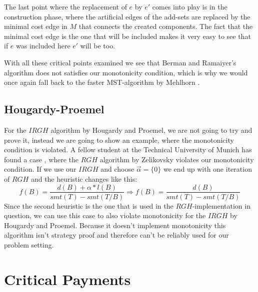 The last point where the replacement of $e$ by $e'$ comes into play is in the construction phase, where the artificial edges of the add-sets are replaced by the minimal cost edge in $M$ that connects the created components. The fact that the minimal cost edge is the one that will be included makes it very easy to see that if $e$ was included here $e'$ will be too.

With all these critical points examined we see that Berman and Ramaiyer's algorithm does not satisfies our monotonicity condition, which is why we would once again fall back to the faster MST-algorithm by Mehlhorn \cite{mehlhorn1988faster}.
\subsection{Hougardy-Proemel}

For the $IRGH$ algorithm by Hougardy and Proemel, we are not going to try and prove it, instead we are going to show an example, where the monotonicity condition is violated. A fellow student at the Technical University of Munich has found a case \cite{guggenbichler20}, where the $RGH$ algorithm by Zelikovsky \cite{zelikovsky1996better} violates our monotonicity condition. If we use our $IRGH$ and choose $\vec{\alpha}=\{ 0\}$ we end up with one iteration of $RGH$ and the heuristic changes like this: 
$$f(B) = \frac{d(B) + \alpha * l(B)}{smt(T)-smt(T/B)} \Rightarrow f(B) = \frac{d(B)}{smt(T)-smt(T/B)}$$
Since the second heuristic is the one that is used in the $RGH$-implementation in question, we can use this case to also violate monotonicity for the $IRGH$ by Hougardy and Proemel. Because it doesn't implement monotonicity this algorithm isn't strategy proof and therefore can't be reliably used for our problem setting. 

\section{Critical Payments}

